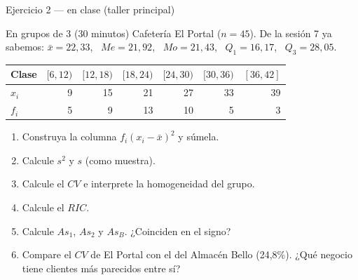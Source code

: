 \documentclass[aspectratio=169,10pt]{beamer}
\begin{document}
\begin{frame}{Ejercicio 2 — en clase (taller principal)}
  \begin{alertblock}{En grupos de 3 (30 minutos)}
    \scriptsize
    Cafetería El Portal ($n = 45$). De la sesión 7 ya sabemos:
    $\bar{x} = 22{,}33$, \ $Me = 21{,}92$, \ $Mo = 21{,}43$, \
    $Q_1 = 16{,}17$, \ $Q_3 = 28{,}05$.

    \vspace{0.15cm}
    \centering
    \begin{tabular}{@{}lrrrrrr@{}}
      \toprule
      \textbf{Clase} & $[6,12)$ & $[12,18)$ & $[18,24)$ & $[24,30)$ &
      $[30,36)$ & $[36,42]$ \\
      \midrule
      $x_i$ &  9 & 15 & 21 & 27 & 33 & 39 \\
      $f_i$ &  5 &  9 & 13 & 10 &  5 &  3 \\
      \bottomrule
    \end{tabular}

    \vspace{0.2cm}
    \raggedright
    \begin{enumerate}\setlength{\itemsep}{-0.07cm}
      \item Construya la columna $f_i(x_i-\bar{x})^2$ y súmela.
      \item Calcule $s^2$ y $s$ (como muestra).
      \item Calcule el $CV$ e interprete la homogeneidad del grupo.
      \item Calcule el $RIC$.
      \item Calcule $As_1$, $As_2$ y $As_B$. ¿Coinciden en el signo?
      \item Compare el $CV$ de El Portal con el del Almacén Bello (24,8\%).
            ¿Qué negocio tiene clientes más parecidos entre sí?
    \end{enumerate}
  \end{alertblock}
\end{frame}
\end{document}
